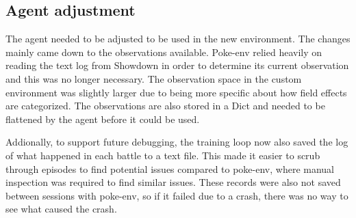\subsection{Agent adjustment}
The agent needed to be adjusted to be used in the new environment. The changes mainly came down to the observations available. 
Poke-env relied heavily on reading the text log from Showdown in order to determine its current observation and this was no
longer necessary. The observation space in the custom environment was slightly larger due to being more specific about how field 
effects are categorized. The observations are also stored in a Dict and needed to be flattened by the agent before it could be 
used.

Addionally, to support future debugging, the training loop now also saved the log of what happened in each battle to a text file.
This made it easier to scrub through episodes to find potential issues compared to poke-env, where manual inspection was 
required to find similar issues. These records were also not saved between sessions with poke-env, so if it failed due to a
crash, there was no way to see what caused the crash.

